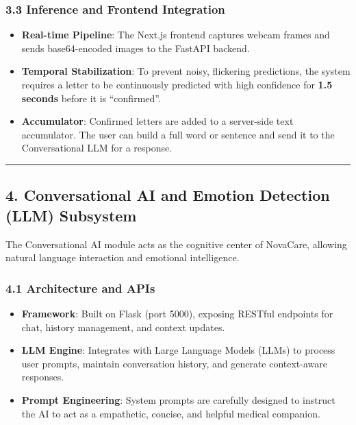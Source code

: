 \documentclass[
]{article}
\providecommand{\tightlist}{%
  \setlength{\itemsep}{0pt}\setlength{\parskip}{0pt}}
\begin{document}
\subsubsection{3.3 Inference and Frontend
Integration}\label{inference-and-frontend-integration}

\begin{itemize}
\tightlist
\item
  \textbf{Real-time Pipeline}: The Next.js frontend captures webcam
  frames and sends base64-encoded images to the FastAPI backend.
\item
  \textbf{Temporal Stabilization}: To prevent noisy, flickering
  predictions, the system requires a letter to be continuously predicted
  with high confidence for \textbf{1.5 seconds} before it is
  ``confirmed''.
\item
  \textbf{Accumulator}: Confirmed letters are added to a server-side
  text accumulator. The user can build a full word or sentence and send
  it to the Conversational LLM for a response.
\end{itemize}

\begin{center}\rule{0.5\linewidth}{0.5pt}\end{center}

\subsection{4. Conversational AI and Emotion Detection (LLM)
Subsystem}\label{conversational-ai-and-emotion-detection-llm-subsystem}

The Conversational AI module acts as the cognitive center of NovaCare,
allowing natural language interaction and emotional intelligence.

\subsubsection{4.1 Architecture and APIs}\label{architecture-and-apis}

\begin{itemize}
\tightlist
\item
  \textbf{Framework}: Built on Flask (port 5000), exposing RESTful
  endpoints for chat, history management, and context updates.
\item
  \textbf{LLM Engine}: Integrates with Large Language Models (LLMs) to
  process user prompts, maintain conversation history, and generate
  context-aware responses.
\item
  \textbf{Prompt Engineering}: System prompts are carefully designed to
  instruct the AI to act as a empathetic, concise, and helpful medical
  companion.
\end{itemize}
\end{document}
